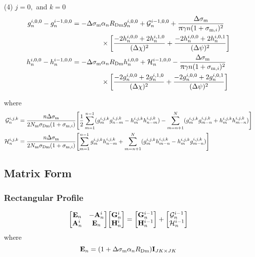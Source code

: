 \documentclass{article}
\begin{document}
(4) $j = 0,$ and $k =0$
\begin{align}
	g_n^{i,0,0}-g_n^{i-1,0,0} = - \Delta\sigma_\text{m}&\alpha_n R_\text{Dm} g_n^{i,0,0}
	+\mathcal{G}_n^{i-1,0,0}
	+\frac{\Delta\sigma_{\mathrm{m}}}{\uppi \gamma n(1+\sigma_{\mathrm{m},i})^2} \nonumber\\
	&\times\qty[\frac{-2h_n^{i,0,0}+2h_n^{i,1,0}}{(\Delta \chi)^2}
	+ \frac{-2h_n^{i,0,0} + 2h_n^{i,0,1} }{(\Delta \psi)^2}]\\
	h_n^{i,0,0}-h_n^{i-1,0,0} = - \Delta\sigma_\text{m}&\alpha_n R_\text{Dm} h_n^{i,0,0}
	+\mathcal{H}_n^{i-1,0,0}
	-\frac{\Delta\sigma_\text{m}}{\uppi \gamma n(1+\sigma_{\mathrm{m},i})^2} \nonumber\\
	&\times\qty[\frac{-2g_n^{i,0,0}+2g_n^{i,1,0}}{(\Delta \chi)^2}
	+ \frac{-2g_n^{i,0,0} + 2g_n^{i,0,1} }{(\Delta \psi)^2}]
\end{align}

where 
\begin{align}
	\mathcal{G}_n^{i,j,k} &= \frac{n\Delta \sigma_\text{m}}{2N_\text{m} \sigma_\text{Dm}
	(1+\sigma_{\mathrm{m},i})}
	\qty[\frac12 \sum_{m=1}^{n-1} (g_m^{i,j,k} g_{n-m}^{i,j,k}-
	h_{m}^{i,j,k} h_{n-m}^{i,j,k}) - 
	\sum_{m=n+1}^N (g_{m}^{i,j,k}g_{m-n}^{i,j,k} + h_{m}^{i,j,k} h_{m-n}^{i,j,k})]\\
	\mathcal{H}_n^{i,j,k} &= \frac{n\Delta \sigma_\text{m}}{2N_\text{m} \sigma_\text{Dm}
	(1+\sigma_{\mathrm{m},i})}
	\qty[\sum_{m=1}^{n-1} g_m^{i,j,k} h_{n-m}^{i,j,k}
	+\sum_{m=n+1}^N (g_{m}^{i,j,k}h_{m-n}^{i,j,k} - h_{m}^{i,j,k} g_{m-n}^{i,j,k})]
\end{align}

\subsection{Matrix Form}

\subsubsection{Rectangular Profile}
\begin{align}
	\mqty[\vb{E}_n & -\vb{A}_n^i \\ \vb{A}_n^i & \vb{E}_n]
	\mqty[\vb{G}_n^i\\ \vb{H}_n^i]
	=
	\mqty[\vb{G}_n^{i-1}\\ \vb{H}_n^{i-1}]
	+
	\mqty[\vb{\mathcal{G}}_n^{i-1}\\ \vb{\mathcal{H}}_n^{i-1}]
\end{align}
	where
$$
\vb{E}_n = (1+\Delta\sigma_\text{m} \alpha_n R_\text{Dm}) \vb{I}_{JK \times JK}$$
\end{document}
